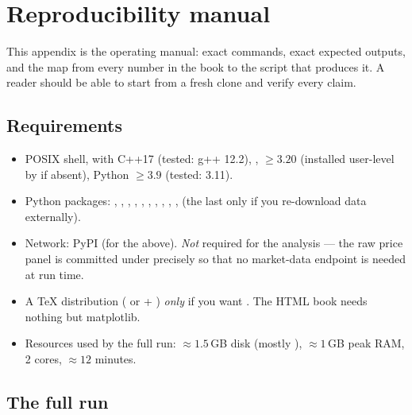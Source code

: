 \section{Reproducibility manual}
\label{ch:reproducibility}

This appendix is the operating manual: exact commands, exact expected outputs, and the map
from every number in the book to the script that produces it. A reader should be able to
start from a fresh clone and verify every claim.

\subsection{Requirements}

\begin{itemize}
  \item POSIX shell,  with C++17 (tested: g++ 12.2), ,
     $\ge3.20$ (installed user-level by  if absent),
    Python $\ge3.9$ (tested: 3.11).
  \item Python packages: , , , ,
    , , , , ,
    ,  (the last only if you re-download data externally).
  \item Network: PyPI (for the above). \emph{Not} required for the analysis --- the raw
    price panel is committed under  precisely so that no
    market-data endpoint is needed at run time.
  \item A TeX distribution ( or  + ) \emph{only}
    if you want . The HTML book needs nothing but matplotlib.
  \item Resources used by the full run: $\approx1.5$\,GB disk (mostly
    ), $\approx1$\,GB peak RAM, 2 cores,
    $\approx12$ minutes.
\end{itemize}

\subsection{The full run}

